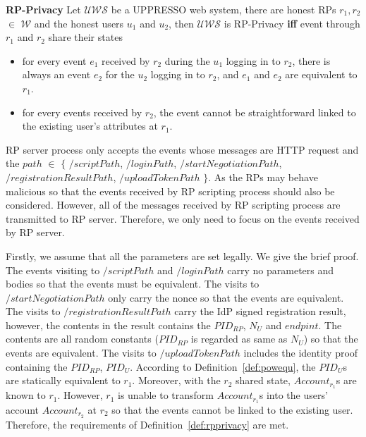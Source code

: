 \begin{definition}
\vspace{1mm}\noindent\textbf{RP-Privacy} Let  $\mathcal{UWS}$ be a UPPRESSO web system, there are honest RPs $r_1, r_2$ $\in$ $\mathcal{W}$ and the honest users $u_1$ and $u_2$, then $\mathcal{UWS}$ is RP-Privacy \textbf{iff} event through $r_1$ and $r_2$ share their states
\begin{itemize}
\item for every event $e_1$ received by $r_2$ during the $u_1$ logging in to $r_2$, there is always an event $e_2$ for the $u_2$ logging in to $r_2$, and $e_1$ and $e_2$ are equivalent to $r_1$.
\item for every events received by $r_2$, the event cannot be straightforward linked to the existing user's attributes at $r_1$.
\end{itemize}
\label{def:rpprivacy}
\end{definition}
RP server process only accepts the events whose messages are HTTP request and the $path$ $\in$ $\{$ $/scriptPath$, $/loginPath$, $/startNegotiationPath$,  $/registrationResultPath$, $/uploadTokenPath$ $\}$.
As the RPs may behave malicious so that the events received by RP scripting process should also be considered. However, all of the messages received by RP scripting process are transmitted to RP server. Therefore, we only need to focus on the events received by RP server. 

Firstly, we assume that all the parameters are set legally. We give the brief proof. The events visiting to $/scriptPath$ and $/loginPath$ carry no parameters and bodies so that the events must be equivalent. The visits to  $/startNegotiationPath$ only carry the nonce so that the events are equivalent. The visits to  $/registrationResultPath$ carry the IdP signed registration result, however, the contents in the result  contains the $PID_{RP}$, $N_U$ and $endpint$. The contents are all random constants ($PID_{RP}$ is regarded as same as $N_U$) so that the events are equivalent. The visits to  $/uploadTokenPath$ includes the identity proof containing the $PID_{RP}$, $PID_U$. According to Definition~\ref{def:powequ}, the $PID_U$s are statically equivalent to $r_1$.  Moreover, with the $r_2$ shared state, $Account_{r_1}$s are known to $r_1$. However, $r_1$ is unable to transform $Account_{r_1}$s into the users' account $Account_{r_2}$ at $r_2$  so that the events cannot be linked to the existing user. Therefore, the requirements of  Definition~\ref{def:rpprivacy}  are met.


